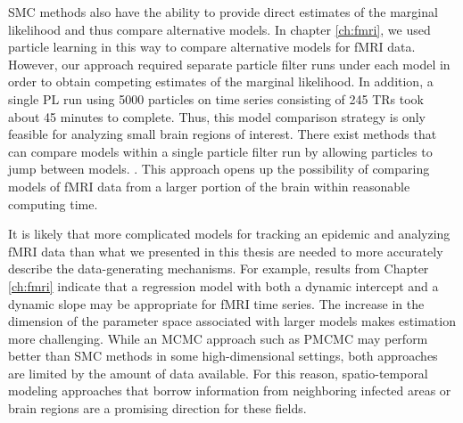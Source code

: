 SMC methods also have the ability to provide direct estimates of the marginal likelihood and thus compare alternative models. In chapter \ref{ch:fmri}, we used particle learning in this way to compare alternative models for fMRI data. However, our approach required separate particle filter runs under each model in order to obtain competing estimates of the marginal likelihood. In addition, a single PL run using 5000 particles on time series consisting of 245 TRs took about 45 minutes to complete. Thus, this model comparison strategy is only feasible for analyzing small brain regions of interest. There exist methods that can compare models within a single particle filter run by allowing particles to jump between models. \citep{berz:gilks:rmcross:2001,zhou:joh:smcmodcomp:2013}. This approach opens up the possibility of comparing models of fMRI data from a larger portion of the brain within reasonable computing time.

It is likely that more complicated models for tracking an epidemic \citep{Sham:Kars:pnas:2012, Bhad:Ioni:mala:2011} and analyzing fMRI data \citep{buxton:balloon:1998} than what we presented in this thesis are needed to more accurately describe the data-generating mechanisms. For example, results from Chapter \ref{ch:fmri} indicate that a regression model with both a dynamic intercept and a dynamic slope may be appropriate for fMRI time series. The increase in the dimension of the parameter space associated with larger models makes estimation more challenging. While an MCMC approach such as PMCMC may perform better than SMC methods in some high-dimensional settings, both approaches are limited by the amount of data available. For this reason, spatio-temporal modeling approaches that borrow information from neighboring infected areas or brain regions are a promising direction for these fields. 